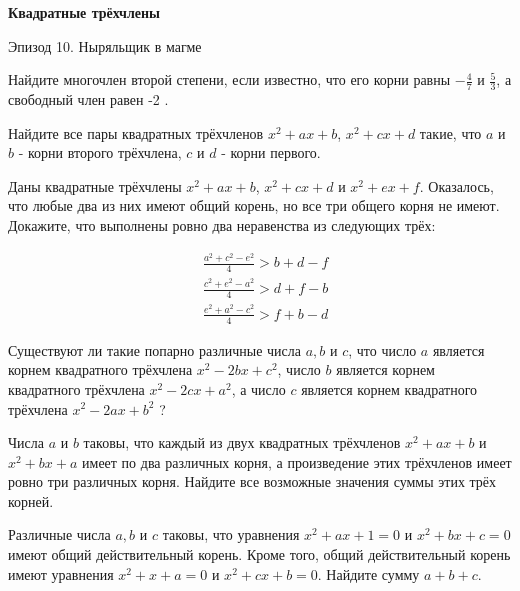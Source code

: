 \centerline{\bf \Huge Квадратные трёхчлены}

\begin{flushright}
        \scriptsize{Эпизод 10. Ныряльщик в магме }
\end{flushright}

Найдите многочлен второй степени, если известно, что его корни равны $-\frac{4}{7}$ и $\frac{5}{3}$, а свободный член равен -2 .

Найдите все пары квадратных трёхчленов $x^2+a x+b$, $x^2+c x+d$ такие, что $a$ и $b$ - корни второго трёхчлена, $c$ и $d$ - корни первого.

Даны квадратные трёхчлены $x^2+a x+b$, $x^2+c x+d$ и $x^2+e x+f$. Оказалось, что любые два из них имеют общий корень, но все три общего корня не имеют. Докажите, что выполнены ровно два неравенства из следующих трёх:

$$
\begin{aligned}
& \frac{a^2+c^2-e^2}{4}>b+d-f \\
& \frac{c^2+e^2-a^2}{4}>d+f-b \\
& \frac{e^2+a^2-c^2}{4}>f+b-d
\end{aligned}
$$

Существуют ли такие попарно различные числа $a, b$ и $c$, что число $a$ является корнем квадратного трёхчлена $x^2-2 b x+c^2$, число $b$ является корнем квадратного трёхчлена $x^2-2 c x+a^2$, а число $c$ является корнем квадратного трёхчлена $x^2-2 a x+b^2$ ?

Числа $a$ и $b$ таковы, что каждый из двух квадратных трёхчленов $x^2+a x+b$ и $x^2+b x+a$ имеет по два различных корня, а произведение этих трёхчленов имеет ровно три различных корня. Найдите все возможные значения суммы этих трёх корней.

Различные числа $a, b$ и $c$ таковы, что уравнения $x^2+a x+1=0$ и $x^2+b x+c=0$ имеют общий действительный корень. Кроме того, общий действительный корень имеют уравнения $x^2+x+a=0$ и $x^2+c x+b=0$. Найдите сумму $a+b+c$.